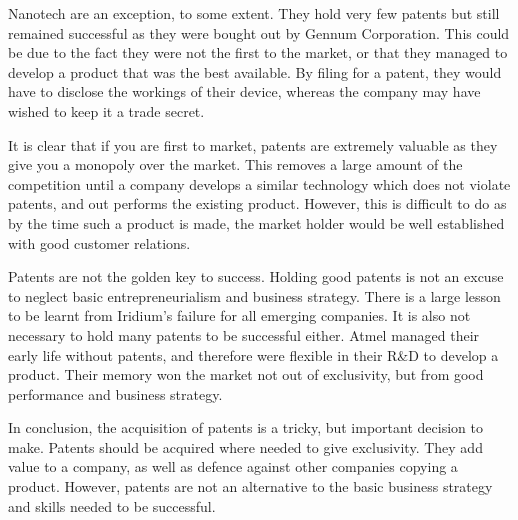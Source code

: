 Nanotech are an exception, to some extent.
They hold very few patents \cite{nanotechpatent} but still remained successful as they were bought out by Gennum Corporation. 
This could be due to the fact they were not the first to the market, or that they managed to develop a product that was the best available. 
By filing for a patent, they would have to disclose the workings of their device, whereas the company may have wished to keep it a trade secret.

It is clear that if you are first to market, patents are extremely valuable as they give you a monopoly over the market. 
This removes a large amount of the competition until a company develops a similar technology which does not violate patents, and out performs the existing product. 
However, this is difficult to do as by the time such a product is made, the market holder would be well established with good customer relations.

Patents are not the golden key to success. 
Holding good patents is not an excuse to neglect basic entrepreneurialism and business strategy. 
There is a large lesson to be learnt from Iridium's failure for all emerging companies.
It is also not necessary to hold many patents to be successful either.
Atmel managed their early life without patents, and therefore were flexible in their R\&D to develop a product. 
Their memory won the market not out of exclusivity, but from good performance and business strategy.

In conclusion, the acquisition of patents is a tricky, but important decision to make.
Patents should be acquired where needed to give exclusivity.
They add value to a company, as well as defence against other companies copying a product.
However, patents are not an alternative to the basic business strategy and skills needed to be successful.



